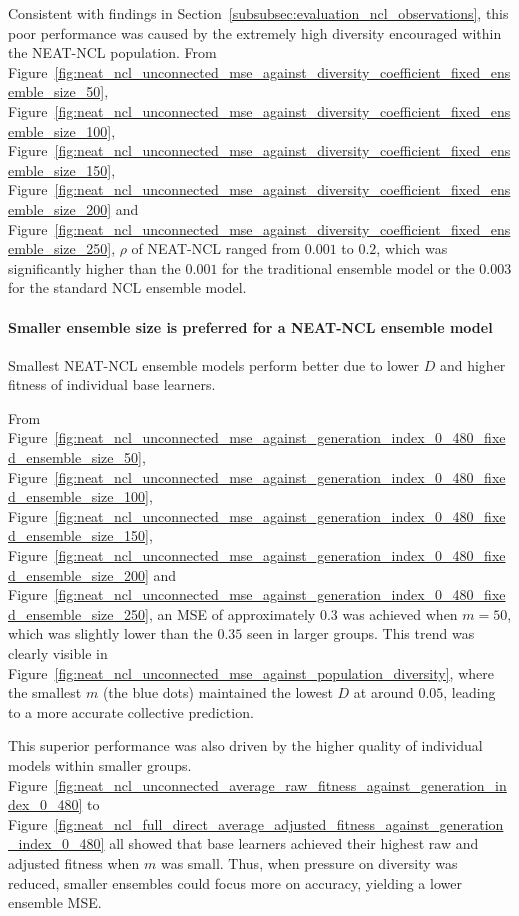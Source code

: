 Consistent with findings in Section~\ref{subsubsec:evaluation_ncl_observations}, this poor performance was caused by the extremely high diversity encouraged within the NEAT-NCL population. From Figure~\ref{fig:neat_ncl_unconnected_mse_against_diversity_coefficient_fixed_ensemble_size_50}, Figure~\ref{fig:neat_ncl_unconnected_mse_against_diversity_coefficient_fixed_ensemble_size_100}, Figure~\ref{fig:neat_ncl_unconnected_mse_against_diversity_coefficient_fixed_ensemble_size_150}, Figure~\ref{fig:neat_ncl_unconnected_mse_against_diversity_coefficient_fixed_ensemble_size_200} and Figure~\ref{fig:neat_ncl_unconnected_mse_against_diversity_coefficient_fixed_ensemble_size_250}, $\rho$ of NEAT-NCL ranged from $0.001$ to $0.2$, which was significantly higher than the $0.001$ for the traditional ensemble model or the $0.003$ for the standard NCL ensemble model. 

\paragraph{Smaller ensemble size is preferred for a NEAT-NCL ensemble model}
Smallest NEAT-NCL ensemble models perform better due to lower $D$ and higher fitness of individual base learners. 

From Figure~\ref{fig:neat_ncl_unconnected_mse_against_generation_index_0_480_fixed_ensemble_size_50}, Figure~\ref{fig:neat_ncl_unconnected_mse_against_generation_index_0_480_fixed_ensemble_size_100}, Figure~\ref{fig:neat_ncl_unconnected_mse_against_generation_index_0_480_fixed_ensemble_size_150}, Figure~\ref{fig:neat_ncl_unconnected_mse_against_generation_index_0_480_fixed_ensemble_size_200} and Figure~\ref{fig:neat_ncl_unconnected_mse_against_generation_index_0_480_fixed_ensemble_size_250}, an MSE of approximately $0.3$ was achieved when $m = 50$, which was slightly lower than the $0.35$ seen in larger groups. This trend was clearly visible in Figure~\ref{fig:neat_ncl_unconnected_mse_against_population_diversity}, where the smallest $m$ (the blue dots) maintained the lowest $D$ at around $0.05$, leading to a more accurate collective prediction. 

This superior performance was also driven by the higher quality of individual models within smaller groups. Figure~\ref{fig:neat_ncl_unconnected_average_raw_fitness_against_generation_index_0_480} to Figure~\ref{fig:neat_ncl_full_direct_average_adjusted_fitness_against_generation_index_0_480} all showed that base learners achieved their highest raw and adjusted fitness when $m$ was small. Thus, when pressure on diversity was reduced, smaller ensembles could focus more on accuracy, yielding a lower ensemble MSE. 

